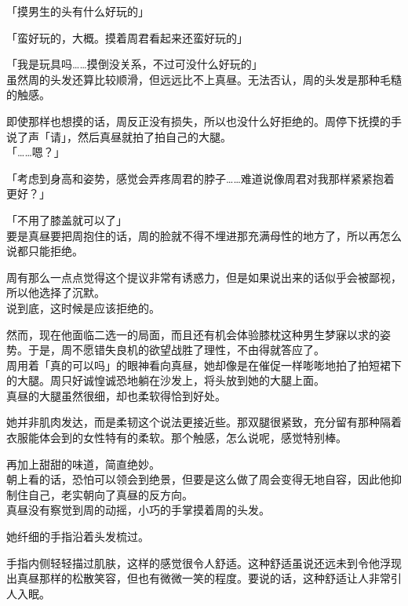 「摸男生的头有什么好玩的」

「蛮好玩的，大概。摸着周君看起来还蛮好玩的」

「我是玩具吗……摸倒没关系，不过可没什么好玩的」\\

虽然周的头发还算比较顺滑，但远远比不上真昼。无法否认，周的头发是那种毛糙的触感。

即使那样也想摸的话，周反正没有损失，所以也没什么好拒绝的。周停下抚摸的手说了声「请」，然后真昼就拍了拍自己的大腿。\\

「……嗯？」

「考虑到身高和姿势，感觉会弄疼周君的脖子……难道说像周君对我那样紧紧抱着更好？」

「不用了膝盖就可以了」\\

要是真昼要把周抱住的话，周的脸就不得不埋进那充满母性的地方了，所以再怎么说都只能拒绝。

周有那么一点点觉得这个提议非常有诱惑力，但是如果说出来的话似乎会被鄙视，所以他选择了沉默。\\

说到底，这时候是应该拒绝的。

然而，现在他面临二选一的局面，而且还有机会体验膝枕这种男生梦寐以求的姿势。于是，周不愿错失良机的欲望战胜了理性，不由得就答应了。\\

周用着「真的可以吗」的眼神看向真昼，她却像是在催促一样嘭嘭地拍了拍短裙下的大腿。周只好诚惶诚恐地躺在沙发上，将头放到她的大腿上面。\\

真昼的大腿虽然很细，却也柔软得恰到好处。

她并非肌肉发达，而是柔韧这个说法更接近些。那双腿很紧致，充分留有那种隔着衣服能体会到的女性特有的柔软。那个触感，怎么说呢，感觉特别棒。

再加上甜甜的味道，简直绝妙。\\

朝上看的话，恐怕可以领会到绝景，但要是这么做了周会变得无地自容，因此他抑制住自己，老实朝向了真昼的反方向。\\

真昼没有察觉到周的动摇，小巧的手掌摸着周的头发。

她纤细的手指沿着头发梳过。

手指内侧轻轻描过肌肤，这样的感觉很令人舒适。这种舒适虽说还远未到令他浮现出真昼那样的松散笑容，但也有微微一笑的程度。要说的话，这种舒适让人非常引人入眠。\\

